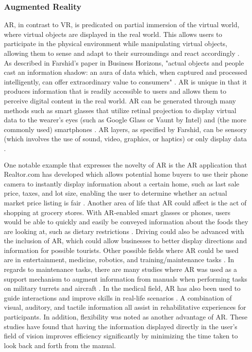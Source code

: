 \documentclass[onecolumn, draftclsnofoot,10pt, compsoc]{IEEEtran}
\begin{document}
\subsubsection{Augmented Reality}
    AR, in contrast to VR, is predicated on partial immersion of the virtual world, where virtual objects are displayed in the real world. This allows users to participate in the physical environment while manipulating virtual objects, allowing them to sense and adapt to their surroundings and react accordingly \cite{1}. As described in Farshid's paper in Business Horizons, "actual objects and people cast an information shadow: an aura of data which, when captured and processed intelligently, can offer extraordinary value to consumers" \cite{2}. AR is unique in that it produces information that is readily accessible to users and allows them to perceive digital content in the real world. AR can be generated through many methods such as smart glasses that utilize retinal projection to display virtual data to the wearer's eyes (such as Google Glass or Vaunt by Intel) and (the more commonly used) smartphones \cite{2}. AR layers, as specified by Farshid, can be sensory (which involves the use of sound, video, graphics, or haptics) or only display data \cite{2}.  
    
    One notable example that expresses the novelty of AR is the AR application that Realtor.com has developed which allows potential home buyers to use their phone camera to instantly display information about a certain home, such as last sale price, taxes, and lot size, enabling the user to determine whether an actual market price listing is fair \cite{2}. Another area of life that AR could affect is the act of shopping at grocery stores. With AR-enabled smart glasses or phones, users would be able to quickly and easily be conveyed information about the foods they are looking at, such as dietary restrictions \cite{2}. Driving could also be advanced with the inclusion of AR, which could allow businesses to better display directions and information for possible tourists. Other possible fields where AR could be used are in entertainment, medicine, robotics, and training/maintenance tasks \cite{2}. In regards to maintenance tasks, there are many studies where AR was used as a support mechanism to augment information from manuals when performing tasks on military turrets and aircraft \cite{1}. In the medical field, AR has also been used to guide interactions and improve skills in real-life scenarios \cite{3}. A combination of visual, auditory, and tactile information all assist in rehabilitative experiences for participants. In addition, flexibility was noted as another advantage of AR. These studies have found that having the information displayed directly in the user's field of vision improves efficiency significantly by minimizing the time taken to look back and forth from the manual.
\end{document}
